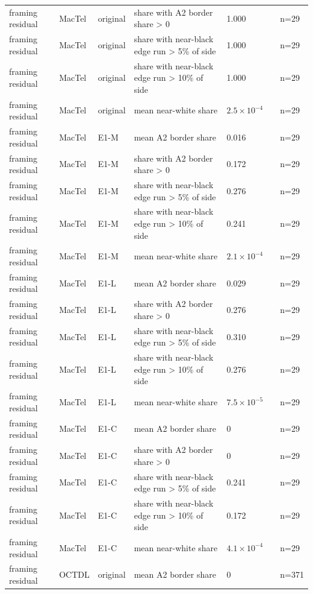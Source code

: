 \begin{longtable}{@{}p{3.3cm}lp{1.5cm}p{3.6cm}p{2.2cm}p{1.6cm}p{3.2cm}@{}}
framing residual & MacTel & original & share with A2 border share > 0 & 1.000 &  & n=29 \\
framing residual & MacTel & original & share with near-black edge run > 5\% of side & 1.000 &  & n=29 \\
framing residual & MacTel & original & share with near-black edge run > 10\% of side & 1.000 &  & n=29 \\
framing residual & MacTel & original & mean near-white share & $2.5\times10^{-4}$ &  & n=29 \\
framing residual & MacTel & E1-M & mean A2 border share & 0.016 &  & n=29 \\
framing residual & MacTel & E1-M & share with A2 border share > 0 & 0.172 &  & n=29 \\
framing residual & MacTel & E1-M & share with near-black edge run > 5\% of side & 0.276 &  & n=29 \\
framing residual & MacTel & E1-M & share with near-black edge run > 10\% of side & 0.241 &  & n=29 \\
framing residual & MacTel & E1-M & mean near-white share & $2.1\times10^{-4}$ &  & n=29 \\
framing residual & MacTel & E1-L & mean A2 border share & 0.029 &  & n=29 \\
framing residual & MacTel & E1-L & share with A2 border share > 0 & 0.276 &  & n=29 \\
framing residual & MacTel & E1-L & share with near-black edge run > 5\% of side & 0.310 &  & n=29 \\
framing residual & MacTel & E1-L & share with near-black edge run > 10\% of side & 0.276 &  & n=29 \\
framing residual & MacTel & E1-L & mean near-white share & $7.5\times10^{-5}$ &  & n=29 \\
framing residual & MacTel & E1-C & mean A2 border share & 0 &  & n=29 \\
framing residual & MacTel & E1-C & share with A2 border share > 0 & 0 &  & n=29 \\
framing residual & MacTel & E1-C & share with near-black edge run > 5\% of side & 0.241 &  & n=29 \\
framing residual & MacTel & E1-C & share with near-black edge run > 10\% of side & 0.172 &  & n=29 \\
framing residual & MacTel & E1-C & mean near-white share & $4.1\times10^{-4}$ &  & n=29 \\
framing residual & OCTDL & original & mean A2 border share & 0 &  & n=371 \\

\end{longtable}
